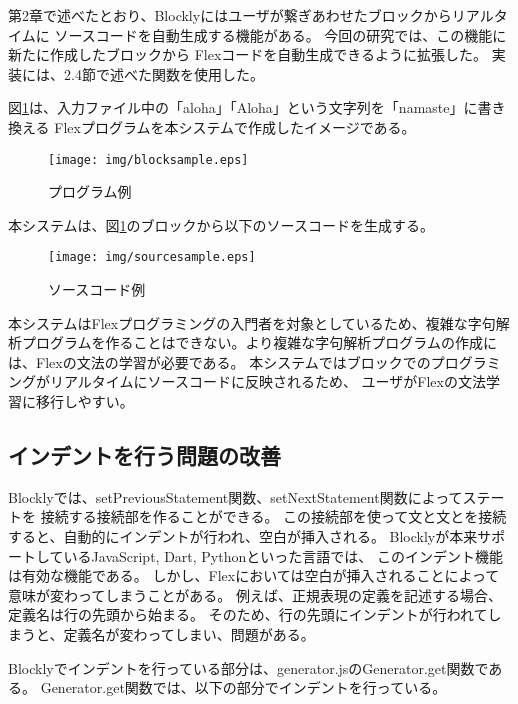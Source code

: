 \documentclass{risepaper}
\begin{document}
第2章で述べたとおり、Blocklyにはユーザが繋ぎあわせたブロックからリアルタイムに
ソースコードを自動生成する機能がある。
今回の研究では、この機能に新たに作成したブロックから
Flexコードを自動生成できるように拡張した。
実装には、2.4節で述べた関数を使用した。

図\ref{fig:blocksample}は、入力ファイル中の「aloha」「Aloha」という文字列を「namaste」に書き換える
Flexプログラムを本システムで作成したイメージである。

\newpage

\begin{figure}[h]
\begin{center}
\texttt{[image: img/blocksample.eps]}
\end{center}%
\caption{プログラム例}%
\label{fig:blocksample}
\end{figure}%

本システムは、図\ref{fig:blocksample}のブロックから以下のソースコードを生成する。

\begin{figure}[h]
\begin{center}
\texttt{[image: img/sourcesample.eps]}
\end{center}%
\caption{ソースコード例}%
\label{fig:sourcesample}
\end{figure}%

本システムはFlexプログラミングの入門者を対象としているため、複雑な字句解析プログラムを作ることはできない。より複雑な字句解析プログラムの作成には、Flexの文法の学習が必要である。
本システムではブロックでのプログラミングがリアルタイムにソースコードに反映されるため、
ユーザがFlexの文法学習に移行しやすい。

\subsection{インデントを行う問題の改善}

Blocklyでは、setPreviousStatement関数、setNextStatement関数によってステートを
接続する接続部を作ることができる。
この接続部を使って文と文とを接続すると、自動的にインデントが行われ、空白が挿入される。
Blocklyが本来サポートしているJavaScript, Dart, Pythonといった言語では、
このインデント機能は有効な機能である。
しかし、Flexにおいては空白が挿入されることによって意味が変わってしまうことがある。
例えば、正規表現の定義を記述する場合、
定義名は行の先頭から始まる。
そのため、行の先頭にインデントが行われてしまうと、定義名が変わってしまい、問題がある。

Blocklyでインデントを行っている部分は、generator.jsのGenerator.get関数である。
Generator.get関数では、以下の部分でインデントを行っている。
\end{document}
